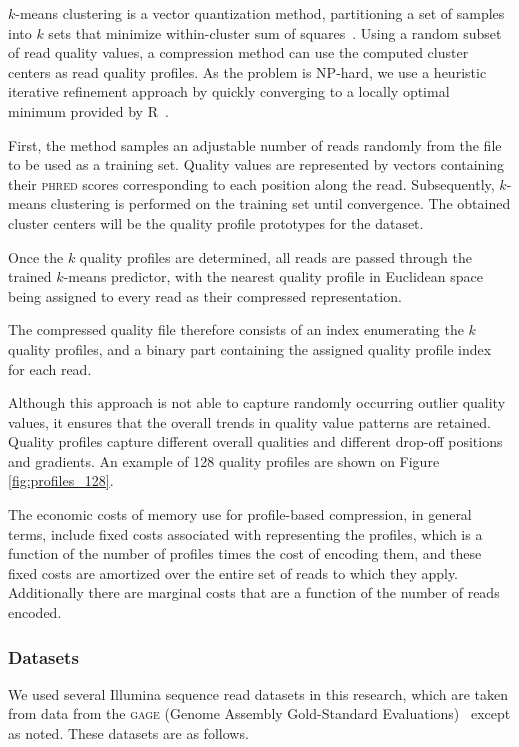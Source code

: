 \documentclass[12pt,\mydriver]{thesis}
\begin{document}
$k$-means clustering is a vector quantization method, partitioning a
set of samples into $k$ sets that minimize within-cluster sum of
squares~\cite{macqueen1967some}. Using a random subset of read
quality values, a compression method can use the computed cluster
centers as read quality profiles. As the problem is NP-hard, we use a
heuristic iterative refinement approach by quickly converging to a
locally optimal minimum provided by R~\cite{hartigan1979algorithm}.

First, the method samples an adjustable number of reads
randomly from the file to be used as a training set. Quality values
are represented by vectors containing their \textsc{phred} scores
corresponding to each position along the read. Subsequently, $k$-means
clustering is performed on the training set until convergence. The
obtained cluster centers will be the quality profile prototypes for
the dataset.

Once the $k$ quality profiles are determined, all reads
are passed through the trained $k$-means predictor, with the nearest
quality profile in Euclidean space being assigned to every read
as their compressed representation.

The compressed quality file therefore consists of an index enumerating
the $k$ quality profiles, and a binary part containing the assigned
quality profile index for each read.

Although this approach is not able to capture randomly occurring
outlier quality values, it ensures that the overall trends in quality
value patterns are retained. Quality profiles capture different overall
qualities and different drop-off positions and gradients. An example
of 128 quality profiles are shown on Figure \ref{fig:profiles_128}.

The economic costs of memory use for profile-based compression, in
general terms, include fixed costs associated with representing the
profiles, which is a function of the number of profiles times the cost
of encoding them, and these fixed costs are amortized over the entire
set of reads to which they apply. Additionally there are marginal
costs that are a function of the number of reads encoded.

\subsubsection{Datasets}

We used several Illumina sequence read datasets in this research,
which are taken from data from the \textsc{gage} (Genome Assembly
Gold-Standard Evaluations)~\cite{Salzberg:2012rc} except as
noted. These datasets are as follows.
\end{document}
